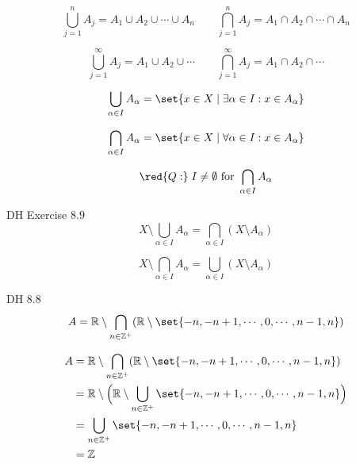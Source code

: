 \begin{frame}{}
    \[
      \bigcup_{j = 1}^{n} A_j = A_1 \cup A_2 \cup \cdots \cup A_n \qquad 
      \bigcap_{j = 1}^{n} A_j = A_1 \cap A_2 \cap \cdots \cap A_n
    \]

    \vspace{0.60cm}
    \[
      \bigcup_{j = 1}^{\infty} A_j = A_1 \cup A_2 \cup \cdots \qquad 
      \bigcap_{j = 1}^{\infty} A_j = A_1 \cap A_2 \cap \cdots 
    \]
\end{frame}

\begin{frame}{}
  \[
    \bigcup_{\alpha \in I} A_{\alpha} = \set{x \in X \mid \exists \alpha \in I: x \in A_{\alpha}}
  \]

  \[
    \bigcap_{\alpha \in I} A_{\alpha} = \set{x \in X \mid \forall \alpha \in I: x \in A_{\alpha}}
  \]

  \pause
  \vspace{0.60cm}
  \[
    \red{Q: } \; I \neq \emptyset \text{ for } \bigcap_{\alpha \in I} A_{\alpha}
  \]
\end{frame}

\begin{frame}{}
  \begin{exampleblock}{DH Exercise $8.9$}
    \[
      X \setminus \bigcup_{\alpha \in I} A_{\alpha} = \bigcap_{\alpha \in I} (X \setminus A_{\alpha})
    \]

    \[
      X \setminus \bigcap_{\alpha \in I} A_{\alpha} = \bigcup_{\alpha \in I} (X \setminus A_{\alpha})
    \]
  \end{exampleblock}
\end{frame}

\begin{frame}{}
  \begin{exampleblock}{DH $8.8$}
    \[
      A = \mathbb{R} \setminus \bigcap_{n \in \mathbb{Z}^{+}} (\mathbb{R} \setminus \set{-n, -n+1, \cdots, 0, \cdots, n-1, n})
    \]
  \end{exampleblock}

  \pause
  \begin{align*}
     A &= \mathbb{R} \setminus \bigcap_{n \in \mathbb{Z}^{+}} (\mathbb{R} \setminus \set{-n, -n+1, \cdots, 0, \cdots, n-1, n}) \\
       &= \mathbb{R} \setminus \Big(\mathbb{R} \setminus \bigcup_{n \in \mathbb{Z}^{+}} \set{-n, -n+1, \cdots, 0, \cdots, n-1, n}\Big) \\
       &= \bigcup_{n \in \mathbb{Z}^{+}} \set{-n, -n+1, \cdots, 0, \cdots, n-1, n} \\
       &= \mathbb{Z}
  \end{align*}
\end{frame}

